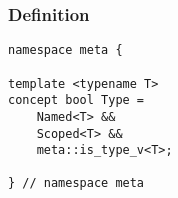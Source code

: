 
\subsubsection{Definition}

\begin{verbatim}
namespace meta {

template <typename T>
concept bool Type =
	Named<T> &&
	Scoped<T> &&
	meta::is_type_v<T>;

} // namespace meta
\end{verbatim}
